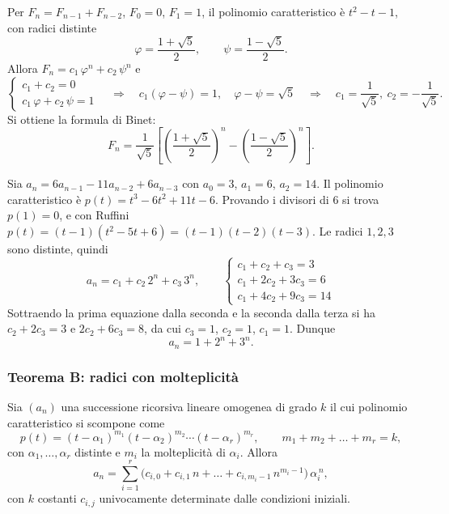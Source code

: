 \documentclass[11pt,a4paper]{article}
\begin{document}
\begin{esempio}[Fibonacci]
Per $F_n = F_{n-1} + F_{n-2}$, $F_0 = 0$, $F_1 = 1$, il polinomio
caratteristico è $t^2 - t - 1$, con radici distinte
\[
  \varphi = \frac{1 + \sqrt{5}}{2} , \qquad \psi = \frac{1 - \sqrt{5}}{2} .
\]
Allora $F_n = c_1\, \varphi^n + c_2\, \psi^n$ e
\[
  \begin{cases}
    c_1 + c_2 = 0 \\
    c_1\, \varphi + c_2\, \psi = 1
  \end{cases}
  \quad\Longrightarrow\quad
  c_1 (\varphi - \psi) = 1 ,\quad \varphi - \psi = \sqrt{5}
  \quad\Longrightarrow\quad c_1 = \frac{1}{\sqrt{5}},\ c_2 = -\frac{1}{\sqrt{5}} .
\]
Si ottiene la formula di Binet:
\[
  F_n = \frac{1}{\sqrt{5}}\left[\left(\frac{1 + \sqrt{5}}{2}\right)^{n}
        - \left(\frac{1 - \sqrt{5}}{2}\right)^{n}\right] .
\]
\end{esempio}

\begin{esempio}[grado 3]
Sia $a_n = 6 a_{n-1} - 11 a_{n-2} + 6 a_{n-3}$ con $a_0 = 3$, $a_1 = 6$,
$a_2 = 14$. Il polinomio caratteristico è
$p(t) = t^3 - 6t^2 + 11t - 6$. Provando i divisori di $6$ si trova
$p(1) = 0$, e con Ruffini $p(t) = (t - 1)(t^2 - 5t + 6) = (t-1)(t-2)(t-3)$.
Le radici $1, 2, 3$ sono distinte, quindi
\[
  a_n = c_1 + c_2\, 2^n + c_3\, 3^n ,
  \qquad
  \begin{cases}
    c_1 + c_2 + c_3 = 3 \\
    c_1 + 2c_2 + 3c_3 = 6 \\
    c_1 + 4c_2 + 9c_3 = 14
  \end{cases}
\]
Sottraendo la prima equazione dalla seconda e la seconda dalla terza si ha
$c_2 + 2c_3 = 3$ e $2c_2 + 6c_3 = 8$, da cui $c_3 = 1$, $c_2 = 1$, $c_1 = 1$.
Dunque
\[
  a_n = 1 + 2^n + 3^n .
\]
\end{esempio}

\subsubsection{Teorema B: radici con molteplicità}

\begin{teorema}[B]
Sia $(a_n)$ una successione ricorsiva lineare omogenea di grado $k$ il cui
polinomio caratteristico si scompone come
\[
  p(t) = (t - \alpha_1)^{m_1} (t - \alpha_2)^{m_2} \cdots (t - \alpha_r)^{m_r},
  \qquad m_1 + m_2 + \dots + m_r = k ,
\]
con $\alpha_1, \dots, \alpha_r$ distinte e $m_i$ la molteplicità di
$\alpha_i$. Allora
\[
  a_n = \sum_{i=1}^{r}
        \bigl(c_{i,0} + c_{i,1}\, n + \dots + c_{i,m_i - 1}\, n^{m_i - 1}\bigr)\,
        \alpha_i^{\,n} ,
\]
con $k$ costanti $c_{i,j}$ univocamente determinate dalle condizioni iniziali.
\end{teorema}
\end{document}
